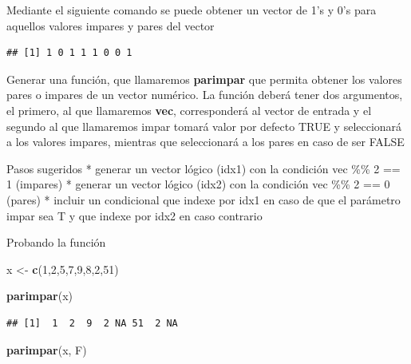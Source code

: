 \documentclass[]{book}
\newenvironment{Shaded}{\begin{snugshade}}{\end{snugshade}}
\newcommand{\DecValTok}[1]{\textcolor[rgb]{0.00,0.00,0.81}{#1}}
\newcommand{\KeywordTok}[1]{\textcolor[rgb]{0.13,0.29,0.53}{\textbf{#1}}}
\newcommand{\NormalTok}[1]{#1}
\newcommand{\OperatorTok}[1]{\textcolor[rgb]{0.81,0.36,0.00}{\textbf{#1}}}
\newcommand{\StringTok}[1]{\textcolor[rgb]{0.31,0.60,0.02}{#1}}
\begin{document}
Mediante el siguiente comando se puede obtener un vector de 1's y 0's para aquellos valores impares y pares del vector

\begin{Shaded}
\end{Shaded}

\begin{verbatim}
## [1] 1 0 1 1 1 0 0 1
\end{verbatim}

Generar una función, que llamaremos \textbf{\textbf{parimpar}} que permita obtener los valores pares o impares de un vector numérico. La función deberá tener dos argumentos, el primero, al que llamaremos \textbf{\textbf{vec}}, corresponderá al vector de entrada y el segundo al que llamaremos impar tomará valor por defecto TRUE y seleccionará a los valores impares, mientras que seleccionará a los pares en caso de ser FALSE

Pasos sugeridos
* generar un vector lógico (idx1) con la condición vec \%\% 2 == 1 (impares)
* generar un vector lógico (idx2) con la condición vec \%\% 2 == 0 (pares)
* incluir un condicional que indexe por idx1 en caso de que el parámetro impar sea T y que indexe por idx2 en caso contrario

Probando la función

\begin{Shaded}
\begin{Highlighting}[]
\NormalTok{x <-}\StringTok{ }\KeywordTok{c}\NormalTok{(}\DecValTok{1}\NormalTok{,}\DecValTok{2}\NormalTok{,}\DecValTok{5}\NormalTok{,}\DecValTok{7}\NormalTok{,}\DecValTok{9}\NormalTok{,}\DecValTok{8}\NormalTok{,}\DecValTok{2}\NormalTok{,}\DecValTok{51}\NormalTok{)}

\KeywordTok{parimpar}\NormalTok{(x)}
\end{Highlighting}
\end{Shaded}

\begin{verbatim}
## [1]  1  2  9  2 NA 51  2 NA
\end{verbatim}

\begin{Shaded}
\begin{Highlighting}[]
\KeywordTok{parimpar}\NormalTok{(x, F)}
\end{Highlighting}
\end{Shaded}
\end{document}
